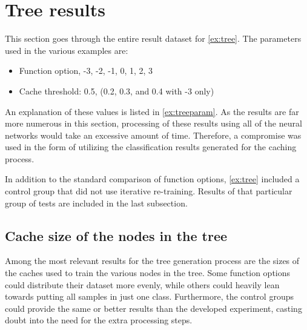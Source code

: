 \section{Tree results}
\label{res:tree}
This section goes through the entire result dataset for \cref{ex:tree}.
The parameters used in the various examples are:

\begin{itemize}
    \item Function option, -3, -2, -1, 0, 1, 2, 3
    \item Cache threshold: 0.5, (0.2, 0.3, and 0.4 with -3 only)
\end{itemize}{}

An explanation of these values is listed in \cref{ex:treeparam}.
As the results are far more numerous in this section, processing of these results using all of the neural networks would take an excessive amount of time.
Therefore, a compromise was used in the form of utilizing the classification results generated for the caching process.

In addition to the standard comparison of function options, \cref{ex:tree} included a control group that did not use iterative re-training.
Results of that particular group of tests are included in the last subsection.

\subsection{Cache size of the nodes in the tree}
Among the most relevant results for the tree generation process are the sizes of the caches used to train the various nodes in the tree.
Some function options could distribute their dataset more evenly, while others could heavily lean towards putting all samples in just one class.
Furthermore, the control groups could provide the same or better results than the developed experiment, casting doubt into the need for the extra processing steps.

